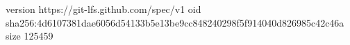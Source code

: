 version https://git-lfs.github.com/spec/v1
oid sha256:4d6107381dae6056d54133b5e13be9cc848240298f5f914040d826985c42c46a
size 125459
